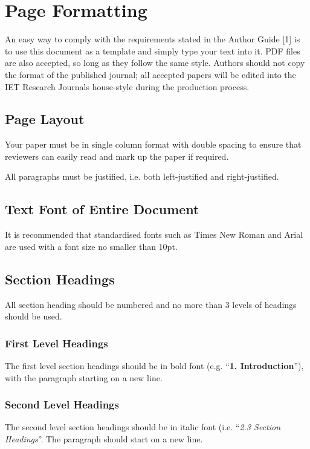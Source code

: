 \documentclass{IET}
\begin{document}
\section{Page Formatting}

An easy way to comply with the requirements stated in the Author Guide [1]
is to use this document as a template and simply type your text into it. PDF
files are also accepted, so long as they follow the same style. Authors
should not copy the format of the published journal; all accepted papers
will be edited into the IET Research Journals house-style during the
production process.

\subsection{Page Layout}

Your paper must be in single column format with double spacing to ensure
that reviewers can easily read and mark up the paper if required.

All paragraphs must be justified, i.e. both left-justified and
right-justified.

\subsection{Text Font of Entire Document}

It is recommended that standardised fonts such as Times New Roman and Arial
are used with a font size no smaller than 10pt.

\subsection{Section Headings}

All section heading should be numbered and no more than 3 levels of headings
should be used.

\subsubsection{First Level Headings}
The first level section headings should be in bold font (e.g.
``\textbf{1. Introduction}''), with the paragraph starting on a new line.

\subsubsection{Second Level Headings}
The second level section headings should be in italic font (i.e. ``\textit{2.3 Section Headings}''. The
paragraph should start on a new line.
\end{document}
